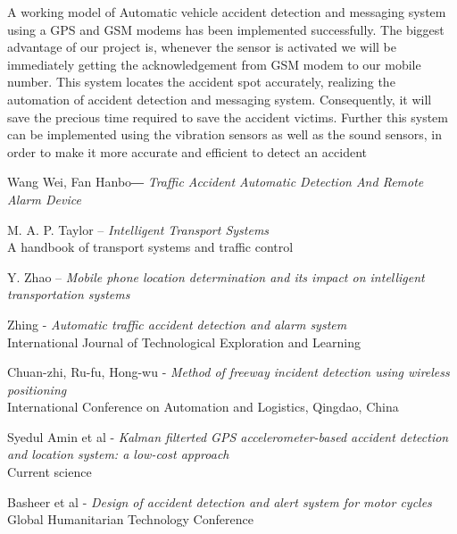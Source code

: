 \documentclass{llncs}
\begin{document}
A working model of Automatic vehicle accident detection and messaging system using a GPS and GSM modems has been implemented successfully. The biggest advantage of our project is, whenever the sensor is activated we will be immediately getting the acknowledgement from GSM modem to our mobile number. This system locates the accident spot accurately, realizing the automation of accident detection and messaging system. Consequently, it will save the precious time required to save the accident victims. Further this system can be implemented using the vibration sensors as well as the sound sensors, in order to make it more accurate and efficient to detect an accident

\begin{thebibliography}{1}

Wang Wei, Fan Hanbo― \emph{Traffic Accident Automatic Detection And Remote Alarm Device}

M. A. P. Taylor – \emph{Intelligent Transport Systems} \\
A handbook of transport systems and traffic control

Y. Zhao – \emph{Mobile phone location determination and its impact on intelligent transportation systems}

Zhing - \emph{Automatic traffic accident detection and alarm system} \\
International Journal of Technological Exploration and Learning 

Chuan-zhi, Ru-fu, Hong-wu - \emph{Method of freeway incident detection using wireless positioning} \\
International Conference on Automation and Logistics, Qingdao, China

Syedul Amin et al - \emph{Kalman filterted GPS accelerometer-based accident detection and location system: a low-cost approach} \\
Current science

Basheer et al - \emph{Design of accident detection and alert system for motor cycles} \\ 
Global Humanitarian Technology Conference

\end{thebibliography}


\end{document}

